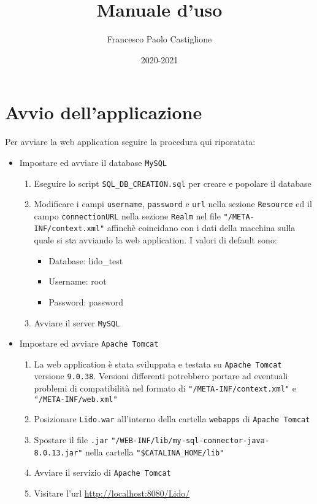 \documentclass{article}
\title{Manuale d'uso}
\author{Francesco Paolo Castiglione}
\date{2020-2021}
\begin{document}
\maketitle

\tableofcontents

\section{Avvio dell'applicazione}

Per avviare la web application seguire la procedura qui riporatata:

\begin{itemize}
	\item Impostare ed avviare il database \texttt{MySQL}
	\begin{enumerate}
		\item Eseguire lo script \texttt{SQL\_DB\_CREATION.sql} per creare e popolare il database
		\item Modificare i campi \texttt{username}, \texttt{password} e \texttt{url} nella sezione \texttt{Resource} ed il campo \texttt{connectionURL} nella sezione \texttt{Realm} nel file \texttt{"/META-INF/context.xml"} affinchè coincidano con i dati della macchina sulla quale si sta avviando la web application.\newline	
		I valori di default sono:
		\begin{itemize}
			\item Database: lido\_test
			\item Username: root
			\item Password: password
		\end{itemize}
		\item Avviare il server \texttt{MySQL}
	\end{enumerate}
	\item Impostare ed avviare \texttt{Apache Tomcat}
	\begin{enumerate}
		\item La web application è stata sviluppata e testata su \texttt{Apache Tomcat} versione \texttt{9.0.38}. Versioni differenti potrebbero portare ad eventuali problemi di compatibilità nel formato di \texttt{"/META-INF/context.xml"} e \texttt{"/META-INF/web.xml"}
		\item Posizionare \texttt{Lido.war} all'interno della cartella \texttt{webapps} di \texttt{Apache Tomcat}
		\item Spostare il file \texttt{.jar} \texttt{"/WEB-INF/lib/my-sql-connector-java-8.0.13.jar"} nella cartella \texttt{"\$CATALINA\_HOME/lib"}
		\item Avviare il servizio di \texttt{Apache Tomcat}
		\item Visitare l'url \url{http://localhost:8080/Lido/}
	\end{enumerate}
\end{itemize}
\end{document}
